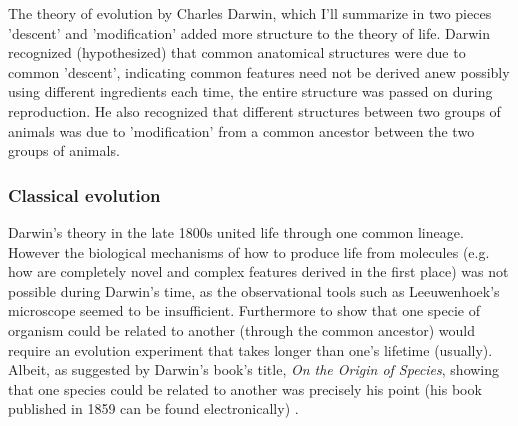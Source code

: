The theory of evolution by Charles Darwin, which I'll summarize in two pieces 'descent' and 'modification' added  more structure to the theory of life.  Darwin recognized (hypothesized) that common anatomical structures were due to common 'descent', indicating common features need not be derived anew possibly using different ingredients each time, the entire structure was passed on during reproduction.  He also recognized that different structures between two groups of animals was due to 'modification' from a common ancestor between the two groups of animals.

\subsubsection{Classical evolution}

Darwin's theory in the late 1800s united life through one common lineage.  However the biological mechanisms of how to produce life from molecules (e.g. how are completely novel and complex features derived in the first place) was not possible during Darwin's time, as the observational tools such as Leeuwenhoek's microscope seemed to be insufficient.  Furthermore to show that one specie of organism could be related to another (through the common ancestor) would require an evolution experiment that takes longer than one's lifetime (usually).  Albeit, as suggested by Darwin's book's title, \textit{On the Origin of Species}, showing that one species could be related to another was precisely his point (his book published in 1859 can be found electronically\cite{darwin}) .

